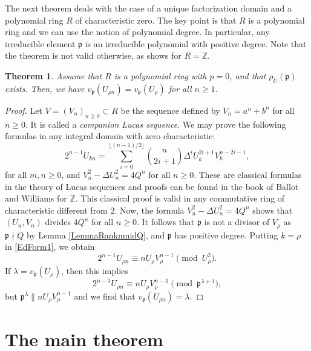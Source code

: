 \documentclass[reqno]{amsart}
\newtheorem{theorem}{Theorem}
\newcommand{\floor}[1]{\lfloor #1 \rfloor}
\begin{document}
The next theorem deals with the case of a unique factorization domain and a polynomial ring $R$ of characteristic zero. The key point is that $R$ is a polynomial ring and we can use the notion of polynomial degree. In particular, any irreducible element $\mathfrak{p}$ is an irreducible polynomial with positive degree. Note that the theorem is not valid otherwise, as \cite[Sect. 2.4, Lemma 11]{BaWi} shows for $R=\mathbb{Z}$.


\begin{theorem}\label{ThmValp=0}
    Assume that $R$ is a polynomial ring with $p=0$, and that $\rho_U(\mathfrak{p})$ exists. Then, we have $v_\mathfrak{p}(U_{\rho n}) = v_\mathfrak{p}(U_\rho)$ for all $n\geq 1$.
\end{theorem}


\begin{proof}
    Let $V=(V_n)_{n\geq 0} \subset R$ be the sequence defined by $V_n=a^n+b^n$ for all $n\geq 0$. It is called a {\it companion Lucas sequence}. We may prove the following formulas in any integral domain with zero characteristic:
     \begin{equation}\label{EdForm1}
        2^{n-1} U_{kn} = \sum_{i=0}^{\floor{(n-1)/2}} \binom{n}{2i+1} \Delta^i U_k^{2i+1} V_k^{n-2i-1},
    \end{equation}
    for all $m,n\geq 0$, and $V_n^2-\Delta U_n^2 = 4Q^n$ for all $n\geq 0$. These are classical formulas in the theory of Lucas sequences and proofs can be found in the book of Ballot and Williams \cite[Sect. 2.2, equations (2.28) and (2.8)]{BaWi} for $\mathbb{Z}$. This classical proof is valid in any commutative ring of characteristic different from $2$. Now, the formula $V_n^2-\Delta U_n^2 = 4Q^n$ shows that $(U_n,V_n)$ divides $4Q^n$ for all $n\geq 0$. It follows that $\mathfrak{p}$ is not a divisor of $V_\rho$ as $\mathfrak{p}\nmid Q$ by Lemma \ref{LemmaRanknmidQ}, and $\mathfrak{p}$ has positive degree. Putting $k=\rho$ in \eqref{EdForm1}, we obtain
    \[
    2^{n-1} U_{\rho n} \equiv n U_\rho V_\rho^{n-1} \pmod{U_\rho^2}.
    \]
    If $\lambda=v_\mathfrak{p}(U_\rho)$, then this implies
    \[
    2^{n-1} U_{\rho n} \equiv n U_\rho V_\rho^{n-1} \pmod{\mathfrak{p}^{\lambda+1}},
    \]
    but $\mathfrak{p}^\lambda \| n U_\rho V_\rho^{n-1}$ and we find that $v_\mathfrak{p}(U_{\rho n}) = \lambda$.
\end{proof}




\section{The main theorem}\label{Section3}
\end{document}
